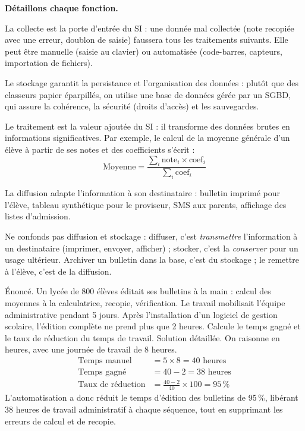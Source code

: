 \documentclass[11pt]{article}
\newcommand{\cle}[1]{{\popxbold\color{popdark}#1}}
\begin{document}
\textbf{Détaillons chaque fonction.}

La \cle{collecte} est la porte d'entrée du SI : une donnée mal collectée (note recopiée avec une erreur, doublon de saisie) faussera tous les traitements suivants. Elle peut être manuelle (saisie au clavier) ou automatisée (code-barres, capteurs, importation de fichiers).

Le \cle{stockage} garantit la persistance et l'organisation des données : plutôt que des classeurs papier éparpillés, on utilise une base de données gérée par un SGBD, qui assure la cohérence, la sécurité (droits d'accès) et les sauvegardes.

Le \cle{traitement} est la valeur ajoutée du SI : il transforme des données brutes en informations significatives. Par exemple, le calcul de la moyenne générale d'un élève à partir de ses notes et des coefficients s'écrit :
\[ \text{Moyenne} = \frac{\sum_{i} \text{note}_i \times \text{coef}_i}{\sum_{i} \text{coef}_i} \]

La \cle{diffusion} adapte l'information à son destinataire : bulletin imprimé pour l'élève, tableau synthétique pour le proviseur, SMS aux parents, affichage des listes d'admission.

\begin{attention}
Ne confonds pas \cle{diffusion} et \cle{stockage} : diffuser, c'est \emph{transmettre} l'information à un destinataire (imprimer, envoyer, afficher) ; stocker, c'est la \emph{conserver} pour un usage ultérieur. Archiver un bulletin dans la base, c'est du stockage ; le remettre à l'élève, c'est de la diffusion.
\end{attention}

\begin{exoresolu}
Énoncé. Un lycée de 800 élèves éditait ses bulletins à la main : calcul des moyennes à la calculatrice, recopie, vérification. Le travail mobilisait l'équipe administrative pendant 5 jours. Après l'installation d'un logiciel de gestion scolaire, l'édition complète ne prend plus que 2 heures. Calcule le temps gagné et le taux de réduction du temps de travail.
\tcblower
Solution détaillée. On raisonne en heures, avec une journée de travail de 8 heures.
\begin{align*}
\text{Temps manuel} &= 5 \times 8 = 40 \text{ heures} \\
\text{Temps gagné} &= 40 - 2 = 38 \text{ heures} \\
\text{Taux de réduction} &= \frac{40 - 2}{40} \times 100 = 95\,\%
\end{align*}
L'automatisation a donc réduit le temps d'édition des bulletins de \num{95}\,\%, libérant 38 heures de travail administratif à chaque séquence, tout en supprimant les erreurs de calcul et de recopie.
\end{exoresolu}
\end{document}
